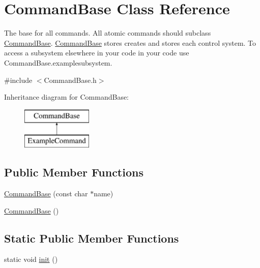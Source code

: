 \hypertarget{class_command_base}{\section{\-Command\-Base \-Class \-Reference}
\label{class_command_base}
}


\-The base for all commands. \-All atomic commands should subclass \hyperlink{class_command_base}{\-Command\-Base}. \hyperlink{class_command_base}{\-Command\-Base} stores creates and stores each control system. \-To access a subsystem elsewhere in your code in your code use \-Command\-Base.\-examplesubsystem.  




{\ttfamily \#include $<$\-Command\-Base.\-h$>$}

\-Inheritance diagram for \-Command\-Base\-:\begin{figure}[H]
\begin{center}
\leavevmode
\includegraphics[height=2.000000cm]{class_command_base}
\end{center}
\end{figure}
\subsection*{\-Public \-Member \-Functions}
\begin{DoxyCompactItemize}
\item 
\hyperlink{class_command_base_a329ddd4c5a6ffd6c9d775a08c361823b}{\-Command\-Base} (const char $\ast$name)
\item 
\hyperlink{class_command_base_af42de9fe79dc64fce99580ee1e2f678f}{\-Command\-Base} ()
\end{DoxyCompactItemize}
\subsection*{\-Static \-Public \-Member \-Functions}
\begin{DoxyCompactItemize}
\item 
static void \hyperlink{class_command_base_a4dbfcd3b6ae92d752bc36a29dd1e1a5a}{init} ()
\end{DoxyCompactItemize}
